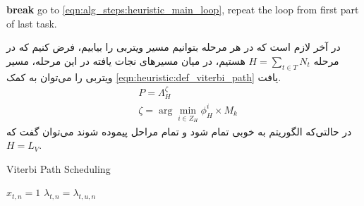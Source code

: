 \begin{latin}
	\begin{algorithm}                     
		\begin{algorithmic} [1]              
			\State\textbf{break}
			\Else
			\EndIf
			\EndFor
			\State go to \cref{eqn:alg_steps:heuristic_main_loop}, repeat the loop from first part of last task.
			\EndIf
			\EndIf
		\end{algorithmic}
	\end{algorithm}
\end{latin}

	در آخر لازم است که در هر مرحله بتوانیم مسیر ویتربی را بیابیم، فرض کنیم که در مرحله $\displaystyle H = \sum_{t \in T}N_t$ هستیم، در میان مسیرهای نجات یافته در این مرحله، مسیر ویتربی را می‌توان به کمک \cref{eqn:heuristic:def_viterbi_path} یافت.
\begin{subequations}
	\begin{align}\label{eqn:heuristic:def_viterbi_path}
		&P = \Lambda_H^\zeta \\
		&\zeta = \arg \min_{i \in Z_H} \phi_H^i \times M_k
	\end{align}
\end{subequations}
در حالتی‌که الگوریتم به خوبی تمام شود و تمام مراحل پیموده شوند می‌توان گفت که $H=L_V$.
\begin{latin}
	\begin{algorithm}
		\caption{Viterbi Path Scheduling}
		\label{alg:viterbi_path_scheduling}
		\begin{algorithmic}[1]
			\State $x_{t,n} = 1$
			\State $\lambda_{t,n} = \lambda_{t,u,n}$
			\EndIf
			\EndFor
		\end{algorithmic}
	\end{algorithm}
\end{latin}

